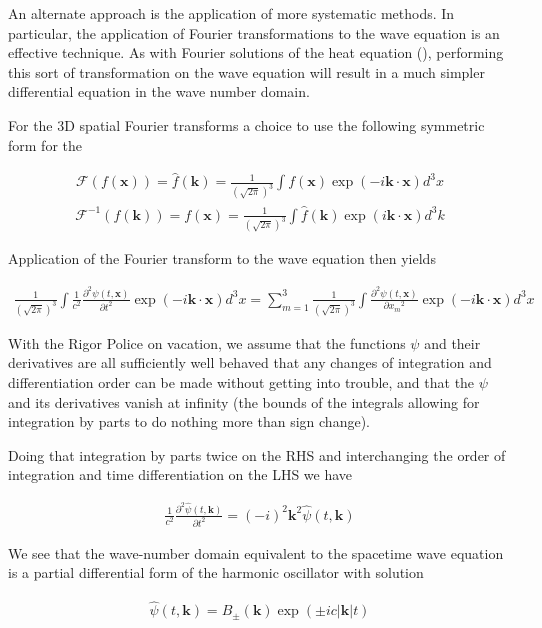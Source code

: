 \documentclass[]{eliblog}
\newcommand{\Abs}[1]{{\left\lvert{#1}\right\rvert}}
\newcommand{\Bk}[0]{\mathbf{k}}
\newcommand{\Bx}[0]{\mathbf{x}}
\newcommand{\inv}[1]{\frac{1}{#1}}
\newcommand{\FF}[0]{\mathcal{F}}
\begin{document}
An alternate approach is the application of more systematic methods.  In particular, the application 
of Fourier transformations to the wave equation is an effective technique.  As with Fourier solutions of the heat equation
(\cite{osgoodFourier}), performing this sort of transformation on the wave equation will result
in a much simpler differential equation in the wave number domain.

For the 3D spatial Fourier transforms a choice to use the following symmetric form for the 

\begin{align}
\FF(f(\Bx)) = \hat{f}(\Bk) = \inv{(\sqrt{2\pi})^3} \int f(\Bx) \exp\left( -i \Bk \cdot \Bx \right) d^3 x 
\end{align}
\begin{align}
\FF^{-1}({f}(\Bk)) = f(\Bx) = \inv{(\sqrt{2\pi})^3} \int \hat{f}(\Bk) \exp\left( i \Bk \cdot \Bx \right) d^3 k
\end{align}

Application of the Fourier 
transform to the wave equation then yields

\begin{align}
\inv{(\sqrt{2\pi})^3} \int 
\inv{c^2} \frac{\partial^2 \psi(t,\Bx)}{\partial t^2}
\exp\left( -i \Bk \cdot \Bx \right) d^3 x 
=
\sum_{m=1}^3 \inv{(\sqrt{2\pi})^3} \int \frac{\partial^2 \psi(t, \Bx) }{\partial {x_m}^2} \exp\left( -i \Bk \cdot \Bx \right) d^3 x 
\end{align}

With the Rigor Police on vacation, we assume that the functions $\psi$ and their derivatives are all sufficiently well behaved that
any changes of integration and differentiation order can be made without getting into trouble, and that the $\psi$ and its derivatives
vanish at infinity (the bounds of the integrals allowing for integration by parts to do nothing more than sign change).

Doing that integration by parts twice on the RHS and interchanging the order of integration and time differentiation on the LHS we have

\begin{align}
\inv{c^2} \frac{\partial^2 \hat{\psi}(t,\Bk)}{\partial t^2} = (-i)^2 \Bk^2 \hat{\psi}(t,\Bk)
\end{align}

We see that the wave-number domain equivalent to the spacetime wave equation is a partial differential form of the
harmonic oscillator with solution

\begin{align}
\hat{\psi}(t,\Bk) = B_{\pm}(\Bk) \exp(\pm i c \Abs{\Bk} t)
\end{align}
\end{document}
